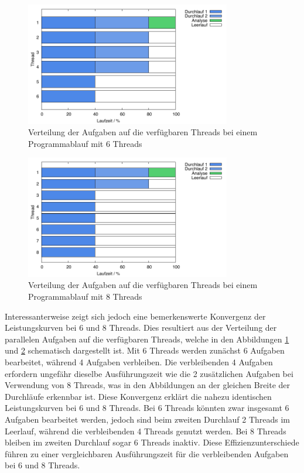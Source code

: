 \begin{figure}[htbp!]
  \centering
  \includegraphics[width=0.8\textwidth]{../results/plots/timeline/timeline_plot_6threads.pdf}
  \caption{Verteilung der Aufgaben auf die verfügbaren Threads bei einem Programmablauf mit 6 Threads}
  \label{fig:runtime_timeline_6threads}
\end{figure}

\begin{figure}[htbp!]
  \centering
  \includegraphics[width=0.8\textwidth]{../results/plots/timeline/timeline_plot_8threads.pdf}
  \caption{Verteilung der Aufgaben auf die verfügbaren Threads bei einem Programmablauf mit 8 Threads}
  \label{fig:runtime_timeline_8threads}
\end{figure}

Interessanterweise zeigt sich jedoch eine bemerkenswerte Konvergenz der Leistungskurven bei 6 und 8 Threads. Dies resultiert aus der Verteilung der parallelen Aufgaben auf die verfügbaren Threads, welche in den Abbildungen \ref{fig:runtime_timeline_6threads} und \ref{fig:runtime_timeline_8threads} schematisch dargestellt ist. Mit 6 Threads werden zunächst 6 Aufgaben bearbeitet, während 4 Aufgaben verbleiben. Die verbleibenden 4 Aufgaben erfordern ungefähr dieselbe Ausführungszeit wie die 2 zusätzlichen Aufgaben bei Verwendung von 8 Threads, was in den Abbildungen an der gleichen Breite der Durchläufe erkennbar ist. Diese Konvergenz erklärt die nahezu identischen Leistungskurven bei 6 und 8 Threads.
Bei 6 Threads könnten zwar insgesamt 6 Aufgaben bearbeitet werden, jedoch sind beim zweiten Durchlauf 2 Threads im Leerlauf, während die verbleibenden 4 Threads genutzt werden. Bei 8 Threads bleiben im zweiten Durchlauf sogar 6 Threads inaktiv. Diese Effizienzunterschiede führen zu einer vergleichbaren Ausführungszeit für die verbleibenden Aufgaben bei 6 und 8 Threads.

